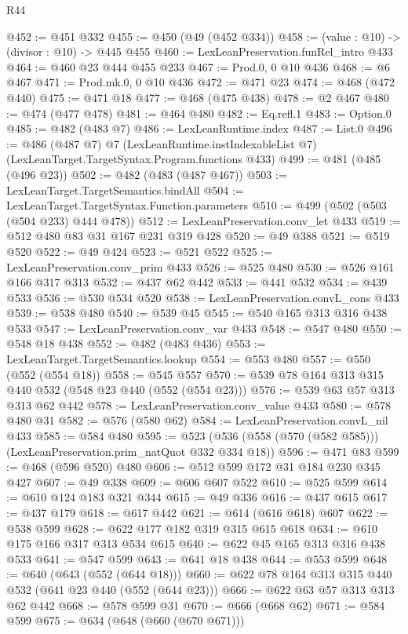 \begin{lexlean}{R44}
\begin{coremodule}
@452 := @451 @332
@455 := @450 (@49 (@452 @334))
@458 := (value : @10) -> (divisor : @10) -> @445 @455
@460 := LexLeanPreservation.funRel_intro @433
@464 := @460 @23 @444 @455 @233
@467 := Prod.{0, 0} @10 @436
@468 := @6 @467
@471 := Prod.mk.{0, 0} @10 @436
@472 := @471 @23
@474 := @468 (@472 @440)
@475 := @471 @18
@477 := @468 (@475 @438)
@478 := @2 @467
@480 := @474 (@477 @478)
@481 := @464 @480
@482 := Eq.refl.{1}
@483 := Option.{0}
@485 := @482 (@483 @7)
@486 := LexLeanRuntime.index
@487 := List.{0}
@496 := @486
    (@487 @7)
    @7
    (LexLeanRuntime.instIndexableList @7)
    (LexLeanTarget.TargetSyntax.Program.functions @433)
@499 := @481 (@485 (@496 @23))
@502 := @482 (@483 (@487 @467))
@503 := LexLeanTarget.TargetSemantics.bindAll
@504 := LexLeanTarget.TargetSyntax.Function.parameters
@510 := @499 (@502 (@503 (@504 @233) @444 @478))
@512 := LexLeanPreservation.conv_let @433
@519 := @512 @480 @83 @31 @167 @231 @319 @428
@520 := @49 @388
@521 := @519 @520
@522 := @49 @424
@523 := @521 @522
@525 := LexLeanPreservation.conv_prim @433
@526 := @525 @480
@530 := @526 @161 @166 @317 @313
@532 := @437 @62 @442
@533 := @441 @532
@534 := @439 @533
@536 := @530 @534 @520
@538 := LexLeanPreservation.convL_cons @433
@539 := @538 @480
@540 := @539 @45
@545 := @540 @165 @313 @316 @438 @533
@547 := LexLeanPreservation.conv_var @433
@548 := @547 @480
@550 := @548 @18 @438
@552 := @482 (@483 @436)
@553 := LexLeanTarget.TargetSemantics.lookup
@554 := @553 @480
@557 := @550 (@552 (@554 @18))
@558 := @545 @557
@570 := @539 @78 @164 @313 @315 @440 @532 (@548 @23 @440 (@552 (@554 @23)))
@576 := @539 @63 @57 @313 @313 @62 @442
@578 := LexLeanPreservation.conv_value @433
@580 := @578 @480 @31
@582 := @576 (@580 @62)
@584 := LexLeanPreservation.convL_nil @433
@585 := @584 @480
@595 := @523 (@536 (@558 (@570 (@582 @585))) (LexLeanPreservation.prim_natQuot @332 @334 @18))
@596 := @471 @83
@599 := @468 (@596 @520) @480
@606 := @512 @599 @172 @31 @184 @230 @345 @427
@607 := @49 @338
@609 := @606 @607 @522
@610 := @525 @599
@614 := @610 @124 @183 @321 @344
@615 := @49 @336
@616 := @437 @615
@617 := @437 @179
@618 := @617 @442
@621 := @614 (@616 @618) @607
@622 := @538 @599
@628 := @622 @177 @182 @319 @315 @615 @618
@634 := @610 @175 @166 @317 @313 @534 @615
@640 := @622 @45 @165 @313 @316 @438 @533
@641 := @547 @599
@643 := @641 @18 @438
@644 := @553 @599
@648 := @640 (@643 (@552 (@644 @18)))
@660 := @622 @78 @164 @313 @315 @440 @532 (@641 @23 @440 (@552 (@644 @23)))
@666 := @622 @63 @57 @313 @313 @62 @442
@668 := @578 @599 @31
@670 := @666 (@668 @62)
@671 := @584 @599
@675 := @634 (@648 (@660 (@670 @671)))

\end{coremodule}
\end{lexlean}

